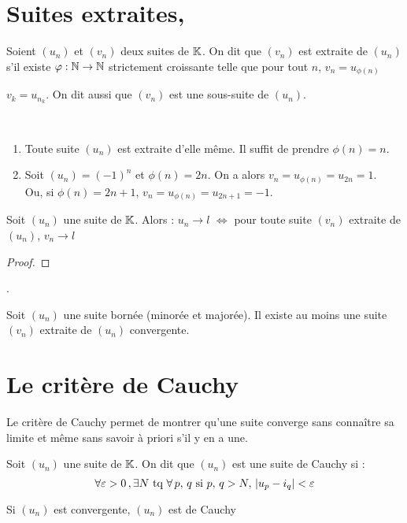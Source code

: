 \section{Suites extraites, \BW}
\begin{defi}
Soient $(u_n)$ et $(v_n)$ deux suites de $\mathbb{K}$. On dit que $(v_n)$ est extraite de $(u_n)$ s'il existe $\varphi : \mathbb{N}\to\mathbb{N}$ strictement croissante telle que pour tout $n$, $v_n = u_{\phi(n)}$
\end{defi}
\begin{nota}
$v_k =u_{n_k}$. On dit aussi que $(v_n)$ est une sous-suite de $(u_n)$.
\end{nota}
\begin{rem}
~
\begin{enumerate}
	\item Toute suite $(u_n)$ est extraite d'elle même. Il suffit de prendre $\phi(n)=n$.
	\item Soit $(u_n) = (-1)^n$ et $\phi(n)=2n$. On a alors $v_n=u_{\phi(n)} = u_{2n} = 1$.\\Ou, si $\phi(n)=2n+1$, $v_n=u_{\phi(n)} = u_{2n+1} = -1$. 
\end{enumerate}
\end{rem}

\begin{lem} Soit $(u_n)$ une suite de $\mathbb{K}$. Alors : $u_n\to l$ $\Leftrightarrow$ pour toute suite $(v_n)$ extraite de $(u_n)$, $v_n\to l$
\end{lem}
\begin{proof}\end{proof} .

\begin{thm}[Théorème de \BW]
Soit $(u_n)$ une suite bornée (minorée et majorée). Il existe au moins une suite $(v_n)$ extraite de $(u_n)$ convergente.
\end{thm}
\section{Le critère de Cauchy}
\begin{inter}
Le critère de Cauchy permet de montrer qu'une suite converge sans connaître sa limite et même sans savoir à priori s'il y en a une.
\end{inter}
\begin{defi}
Soit $(u_n)$ une suite de $\mathbb{K}$. On dit que $(u_n)$ est une suite de Cauchy si :
$$\forall \varepsilon>0\,,\exists N\text{~tq~}\forall\, p,\,q \text{~si~} p,\,q>N,\,|u_p-i_q|<\varepsilon$$
\end{defi}
\begin{prop}
Si $(u_n)$ est convergente, $(u_n)$ est de Cauchy
\end{prop}

